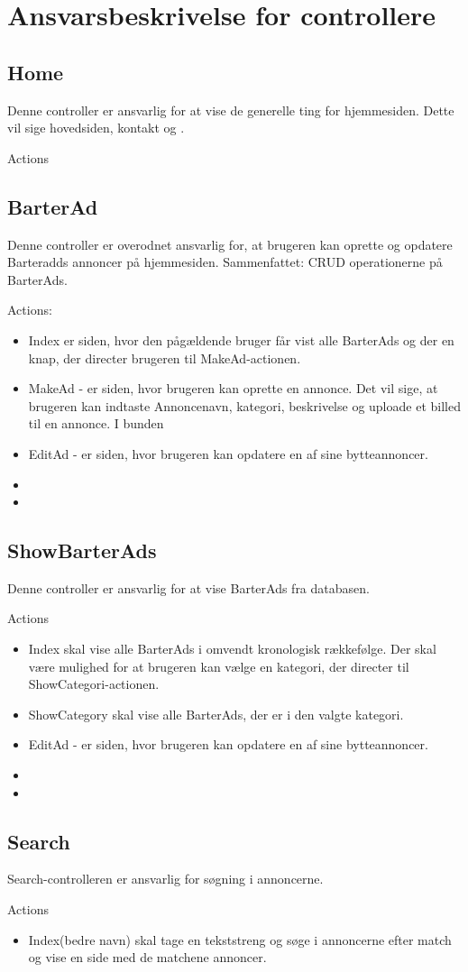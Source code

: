 \chapter{Ansvarsbeskrivelse for controllere}\label{ch:Controllere}

\section{Home}
Denne controller er ansvarlig for at vise de generelle ting for hjemmesiden. Dette vil sige hovedsiden, kontakt og . 

Actions


\section{BarterAd}
Denne controller er overodnet ansvarlig for, at brugeren kan oprette og opdatere Barteradds annoncer på hjemmesiden. Sammenfattet: CRUD operationerne på BarterAds.

Actions:
\begin{itemize}
	\item Index er siden, hvor den pågældende bruger får vist alle BarterAds og der en knap, der directer brugeren til MakeAd-actionen.
	\item MakeAd - er siden, hvor brugeren kan oprette en annonce. Det vil sige, at brugeren kan indtaste Annoncenavn, kategori, beskrivelse og uploade et billed til en annonce. I bunden
	\item EditAd - er siden, hvor brugeren kan opdatere en af sine bytteannoncer.
	\item 
	\item
\end{itemize}

\section{ShowBarterAds}
Denne controller er ansvarlig for at vise BarterAds fra databasen.

Actions 
\begin{itemize}
	\item Index skal vise alle BarterAds i omvendt kronologisk rækkefølge. Der skal være mulighed for at brugeren kan vælge en kategori, der directer til ShowCategori-actionen.
	\item ShowCategory skal vise alle BarterAds, der er i den valgte kategori.
	\item EditAd - er siden, hvor brugeren kan opdatere en af sine bytteannoncer.
	\item 
	\item
\end{itemize}


\section{Search}
Search-controlleren er ansvarlig for søgning i annoncerne. 

Actions 
\begin{itemize}
	\item Index(bedre navn) skal tage en tekststreng og søge i annoncerne efter match og vise en side med de matchene annoncer.
\end{itemize}
